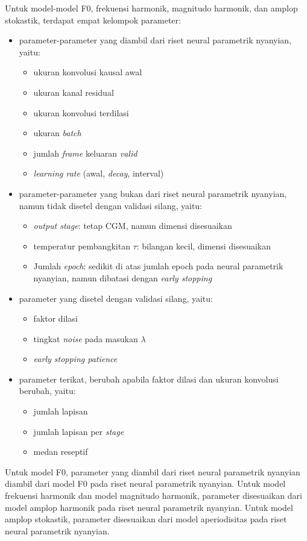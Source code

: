 Untuk model-model F0, frekuensi harmonik, magnitudo harmonik, dan amplop stokastik, terdapat empat kelompok parameter:
\begin{itemize}
	\item parameter-parameter yang diambil dari riset neural parametrik nyanyian, yaitu:
	\begin{itemize}
		\item ukuran konvolusi kausal awal
		\item ukuran kanal residual
		\item ukuran konvolusi terdilasi
		\item ukuran \textit{batch}
		\item jumlah \textit{frame} keluaran \textit{valid}
		\item \textit{learning rate} (awal, \textit{decay}, interval)
	\end{itemize}
	\item parameter-parameter yang bukan dari riset neural parametrik nyanyian, namun tidak disetel dengan validasi silang, yaitu:
	\begin{itemize}
		\item \textit{output stage}: tetap CGM, namun dimensi disesuaikan
		\item temperatur pembangkitan $\tau$: bilangan kecil, dimensi disesuaikan
		\item Jumlah \textit{epoch}: sedikit di atas jumlah epoch pada neural parametrik nyanyian, namun dibatasi dengan \textit{early stopping}
	\end{itemize}
	\item parameter yang disetel dengan validasi silang, yaitu:
	\begin{itemize}
		\item faktor dilasi
		\item tingkat \textit{noise} pada masukan $\lambda$
		\item \textit{early stopping patience}
	\end{itemize}
	\item parameter terikat, berubah apabila faktor dilasi dan ukuran konvolusi berubah, yaitu:
	\begin{itemize}
		\item jumlah lapisan
		\item jumlah lapisan per \textit{stage}
		\item medan reseptif
	\end{itemize}
\end{itemize}

Untuk model F0, parameter yang diambil dari riset neural parametrik nyanyian diambil dari model F0 pada riset neural parametrik nyanyian. Untuk model frekuensi harmonik dan model magnitudo harmonik, parameter disesuaikan dari model amplop harmonik pada riset neural parametrik nyanyian. Untuk model amplop stokastik, parameter disesuaikan dari model aperiodisitas pada riset neural parametrik nyanyian.

